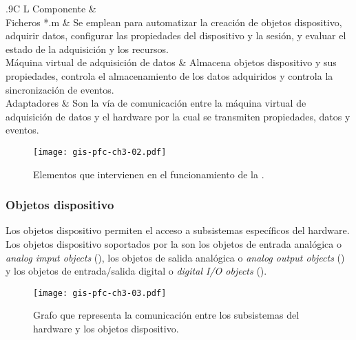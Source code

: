 \begin{table}
	\centering
	\begin{tabulary}{.9\textwidth}{C L}
		\toprule
		Componente &  \\
		\midrule
		Ficheros *.m & Se emplean para automatizar la creación de
		objetos dispositivo, adquirir datos, configurar las
		propiedades del dispositivo y la sesión, y evaluar el
		estado de la adquisición y los recursos.\\
		\midrule
		Máquina virtual de adquisición de datos & Almacena objetos
		dispositivo y sus propiedades, controla el almacenamiento
		de los datos adquiridos y controla la sincronización de
		eventos.\\
		\midrule
		Adaptadores & Son la vía de comunicación entre la máquina
		virtual de adquisición de datos y el hardware por la cual
		se transmiten propiedades, datos y eventos.\\
		\bottomrule
	\end{tabulary}
	\caption[Descripción de los componentes de la \datx{}] {Descripción
	de los componentes de la \datx{}.}
	\label{tab:toolcomp}
\end{table}

\begin{figure}
	\begin{center}
		\texttt{[image: gis-pfc-ch3-02.pdf]}
	\end{center}
	\caption[Elementos que intervienen en el proceso de
	adquisición]{Elementos que intervienen en el funcionamiento de la
	\datx{}.}
	\label{fig:toolcomp}
\end{figure}

\subsubsection{Objetos dispositivo}

Los objetos dispositivo permiten el acceso a subsistemas específicos del
hardware. Los objetos dispositivo soportados por la \datx{} son los objetos
de entrada analógica o \emph{analog imput objects} (), los objetos
de salida analógica o \emph{analog output objects} () y los
objetos de entrada/salida digital o \emph{digital I/O objects}
().

\begin{figure}
	\begin{center}
		\texttt{[image: gis-pfc-ch3-03.pdf]}
	\end{center}
	\caption[Flujo de información entre el hardware y la
	]{Grafo que representa la comunicación entre los
	subsistemas del hardware y los objetos dispositivo.}
	\label{fig:subsystemsOO}
\end{figure}


